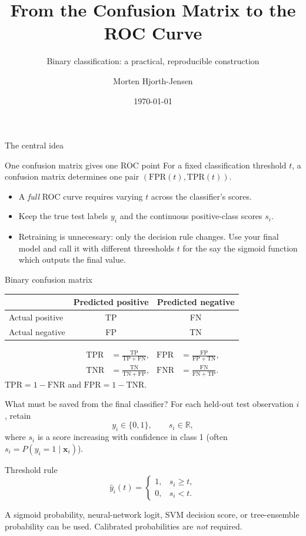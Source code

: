 \documentclass[aspectratio=169,11pt]{beamer}
\title[Binary ROC curves]{From the Confusion Matrix to the ROC Curve}
\subtitle{Binary classification: a practical, reproducible construction}
\author{Morten Hjorth-Jensen}
\date{\today}
\begin{document}
\begin{frame}\titlepage\end{frame}
\begin{frame}{The central idea}
\begin{block}{One confusion matrix gives one ROC point}
For a fixed classification threshold $t$, a confusion matrix determines one pair $(\mathrm{FPR}(t),\mathrm{TPR}(t))$.
\end{block}
\begin{itemize}
\item A \emph{full} ROC curve requires varying $t$ across the classifier's scores.
\item Keep the true test labels $y_i$ and the continuous positive-class scores $s_i$.
\item Retraining is unnecessary: only the decision rule changes. Use your final model and call it with different threesholds $t$ for the say the sigmoid function which outputs the final value.
\end{itemize}
\end{frame}
\begin{frame}{Binary confusion matrix}
\centering
\begin{tabular}{lcc}
\toprule
& Predicted positive & Predicted negative\\\midrule
Actual positive & TP & FN\\
Actual negative & FP & TN\\\bottomrule
\end{tabular}
\vspace{1em}
\begin{align*}
\mathrm{TPR}&=\frac{\mathrm{TP}}{\mathrm{TP}+\mathrm{FN}}, &
\mathrm{FPR}&=\frac{\mathrm{FP}}{\mathrm{FP}+\mathrm{TN}},\\
\mathrm{TNR}&=\frac{\mathrm{TN}}{\mathrm{TN}+\mathrm{FP}}, &
\mathrm{FNR}&=\frac{\mathrm{FN}}{\mathrm{FN}+\mathrm{TP}}.
\end{align*}
\small $\mathrm{TPR}=1-\mathrm{FNR}$ and $\mathrm{FPR}=1-\mathrm{TNR}$.
\end{frame}
\begin{frame}{What must be saved from the final classifier?}
For each held-out test observation $i$, retain
\begin{equation*}
y_i\in\{0,1\},\qquad s_i\in\mathbb{R},
\end{equation*}
where $s_i$ is a score increasing with confidence in class 1 (often $s_i=P(y_i=1\mid\mathbf{x}_i)$).
\begin{block}{Threshold rule}
\[\widehat y_i(t)=\begin{cases}1,&s_i\ge t,\\0,&s_i<t.\end{cases}\]
\end{block}
A sigmoid probability, neural-network logit, SVM decision score, or tree-ensemble probability can be used. Calibrated probabilities are \emph{not} required.
\end{frame}
\end{document}
